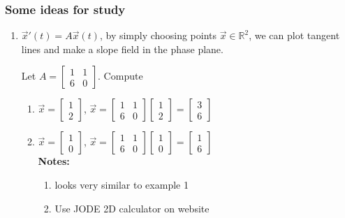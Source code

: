 \subsubsection*{Some ideas for study}
\begin{enumerate}[label=\protect\circled{\Roman*}]
	\item $\vec{x}'(t) = A \vec{x}(t)$, by simply choosing points $\vec{x} \in \mathbb{R}^2$, we can plot tangent lines and make a slope field in the phase plane.
	\begin{example-N}
		Let $A = \begin{bmatrix}
			1 & 1\\ 6 & 0
		\end{bmatrix}$. Compute
		\begin{enumerate}[label=\protect\circled{\alph*}]
		\item $\vec{x} = \begin{bmatrix}
			1\\2
		\end{bmatrix}$, $\vec{x} = \begin{bmatrix}
			1 & 1\\ 6 & 0
		\end{bmatrix}
		\begin{bmatrix}
			1\\2
		\end{bmatrix} = 
		\begin{bmatrix}
			3\\6
		\end{bmatrix}$
		\item $\vec{x} = \begin{bmatrix}
			1\\0
		\end{bmatrix}$, $\vec{x} = \begin{bmatrix}
			1 & 1\\ 6 & 0
		\end{bmatrix}
		\begin{bmatrix}
			1\\0
		\end{bmatrix} = 
		\begin{bmatrix}
			1\\6
		\end{bmatrix}$\\
		\textbf{Notes: } 
			\begin{enumerate}[label=\protect\circled{\arabic*}]
			\item looks very similar to example 1
			\item Use JODE 2D calculator on website

\end{enumerate}
\end{enumerate}
\end{example-N}
\end{enumerate}
